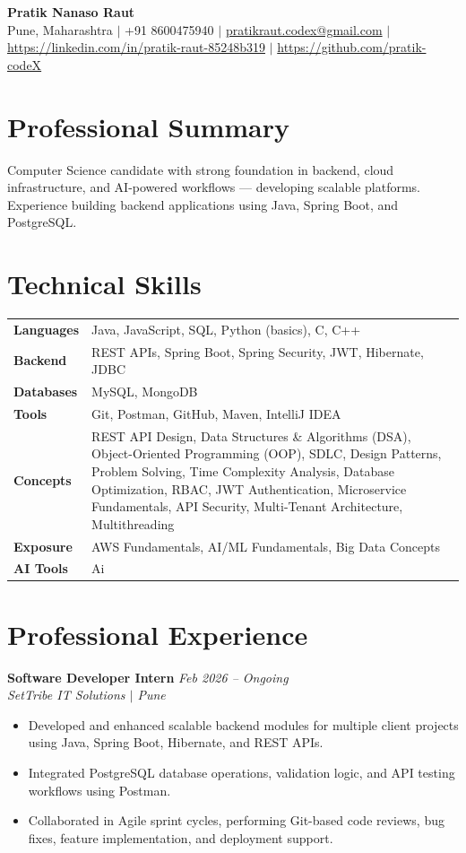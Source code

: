 \documentclass[10.5pt,a4paper]{article}
\begin{document}
\begin{center}
{\Large\bfseries Pratik Nanaso Raut}\\[2pt]
Pune, Maharashtra $|$ +91 8600475940 $|$ \href{mailto:pratikraut.codex@gmail.com}{pratikraut.codex@gmail.com} $|$ \href{https://linkedin.com/in/pratik-raut-85248b319}{https://linkedin.com/in/pratik-raut-85248b319} $|$ \href{https://github.com/pratik-codeX}{https://github.com/pratik-codeX}
\end{center}
\vspace{-2pt}
\section{Professional Summary}
Computer Science candidate with strong foundation in backend, cloud infrastructure, and AI-powered workflows — developing scalable platforms. Experience building backend applications using Java, Spring Boot, and PostgreSQL.
\section{Technical Skills}
\begin{tabular}{@{}p{}p{}@{}}
\textbf{Languages} & Java, JavaScript, SQL, Python (basics), C, C++ \\[1pt]
\textbf{Backend} & REST APIs, Spring Boot, Spring Security, JWT, Hibernate, JDBC \\[1pt]
\textbf{Databases} & MySQL, MongoDB \\[1pt]
\textbf{Tools} & Git, Postman, GitHub, Maven, IntelliJ IDEA \\[1pt]
\textbf{Concepts} & REST API Design, Data Structures \& Algorithms (DSA), Object-Oriented Programming (OOP), SDLC, Design Patterns, Problem Solving, Time Complexity Analysis, Database Optimization, RBAC, JWT Authentication, Microservice Fundamentals, API Security, Multi-Tenant Architecture, Multithreading \\[1pt]
\textbf{Exposure} & AWS Fundamentals, AI/ML Fundamentals, Big Data Concepts \\[1pt]
\textbf{AI Tools} & Ai \\
\end{tabular}
\section{Professional Experience}
\textbf{Software Developer Intern} \hfill \textit{Feb 2026 -- Ongoing}
\\\textit{SetTribe IT Solutions $|$ Pune}
\begin{itemize}
  \item Developed and enhanced scalable backend modules for multiple client projects using Java, Spring Boot, Hibernate, and REST APIs.
  \item Integrated PostgreSQL database operations, validation logic, and API testing workflows using Postman.
  \item Collaborated in Agile sprint cycles, performing Git-based code reviews, bug fixes, feature implementation, and deployment support.
\end{itemize}
\end{document}
